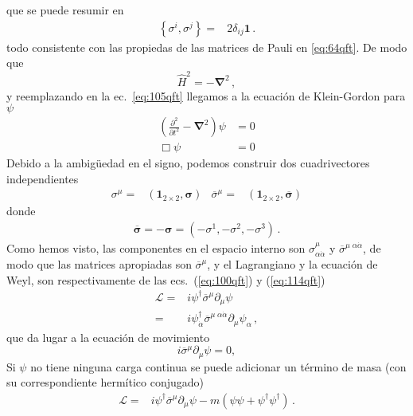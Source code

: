 que se puede resumir en
\begin{align}
  \left\{ \sigma^i,\sigma^j \right\}=&2\delta_{ij} \mathbf{1}\,.
\end{align}
todo consistente con las propiedas de las matrices de Pauli en  \eqref{eq:64qft}. 
De modo que
\begin{equation}
  \hat{H}^2=-\boldsymbol{\nabla}^2\,,
\end{equation}
y reemplazando en la ec.~\eqref{eq:105qft} llegamos a la ecuación de Klein-Gordon para $\psi$
\begin{align}
   \left(\frac{\partial^2}{\partial t^2}-\boldsymbol{\nabla}^2\right)\psi&=0\nonumber\\
   \Box\psi&=0
\end{align}
Debido a la ambigüedad  en el signo, podemos construir dos cuadrivectores independientes
   \begin{align}
 \sigma^{\mu}=& \left( \mathbf{1}_{2\times2},\boldsymbol{\sigma} \right)&
 \overline{\sigma}^{\mu}=& \left( \mathbf{1}_{2\times2},\overline{\boldsymbol{\sigma}} \right)
\end{align}
donde
\begin{align}
  \overline{\boldsymbol{\sigma}}=-\boldsymbol{\sigma}=\left(-\sigma^1,-\sigma^2,-\sigma^3\right)\,.
\end{align}
Como hemos visto, las componentes en el espacio interno son
$\sigma^{\mu}_{\alpha\dot{\alpha}}$ y $\overline{\sigma}^{\mu\;\alpha\dot{\alpha}}$, de modo que  las matrices apropiadas son $\overline{\sigma}^\mu$, y el Lagrangiano  y la ecuación de Weyl, son respectivamente de las ecs.~(\ref{eq:100qft}) y (\ref{eq:114qft})
\begin{align}
  \label{eq:115qft}
  \mathcal{L}=&i\psi^\dagger\overline{\sigma}^\mu\partial_\mu\psi \nonumber\\
      =&i\psi^\dagger_{\dot{\alpha}}\overline{\sigma}^{\mu\; \alpha\dot{\alpha}}\partial_\mu\psi_{\alpha}\,,
\end{align}
que da lugar a la ecuación de movimiento
\begin{equation}
  \label{eq:116qft}
  i\overline{\sigma}^\mu\partial_\mu\psi=0,
\end{equation}
Si $\psi$ no tiene ninguna carga continua se puede adicionar un término de masa (con su correspondiente hermítico conjugado)
\begin{align}
  \mathcal{L}=& i\psi^\dagger\overline{\sigma}^\mu\partial_\mu\psi -m \left( \psi\psi+\psi^{\dagger}\psi^{\dagger} \right)\,.
\end{align}


